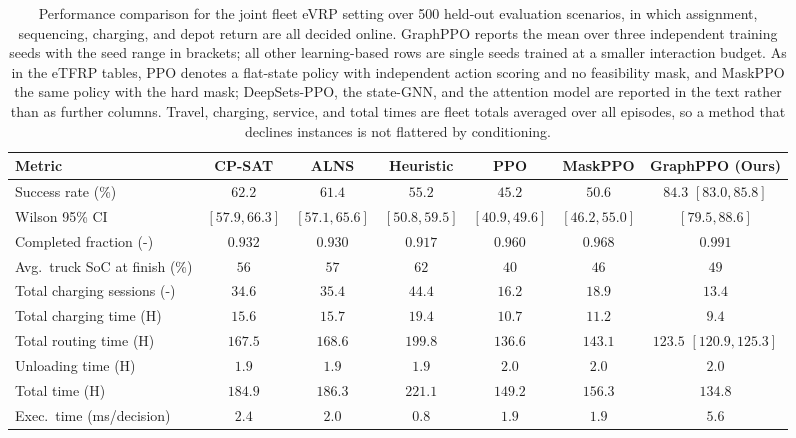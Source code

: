 \documentclass[a4paper,fleqn]{cas-sc}
\begin{document}
\begin{table}
\centering
\small
\caption{Performance comparison for the joint fleet eVRP setting over 500 held-out evaluation scenarios, in which assignment, sequencing, charging, and depot return are all decided online. GraphPPO reports the mean over three independent training seeds with the seed range in brackets; all other learning-based rows are single seeds trained at a smaller interaction budget. As in the eTFRP tables, PPO denotes a flat-state policy with independent action scoring and no feasibility mask, and MaskPPO the same policy with the hard mask; DeepSets-PPO, the state-GNN, and the attention model are reported in the text rather than as further columns. Travel, charging, service, and total times are fleet totals averaged over all episodes, so a method that declines instances is not flattered by conditioning.}
\begin{tabular}{@{}lcccccc@{}}
\toprule
Metric & CP-SAT & ALNS & Heuristic & PPO & MaskPPO & GraphPPO (Ours) \\
\midrule
Success rate (\%) & $62.2$ & $61.4$ & $55.2$ & $45.2$ & $50.6$ & $\mathbf{84.3}$ $[83.0, 85.8]$ \\
Wilson 95\% CI & $[57.9, 66.3]$ & $[57.1, 65.6]$ & $[50.8, 59.5]$ & $[40.9, 49.6]$ & $[46.2, 55.0]$ & $[79.5, 88.6]$ \\
Completed fraction (-) & $0.932$ & $0.930$ & $0.917$ & $0.960$ & $0.968$ & $\mathbf{0.991}$ \\
Avg.\ truck SoC at finish (\%) & $56$ & $57$ & $62$ & $40$ & $46$ & $49$ \\
Total charging sessions (-) & $34.6$ & $35.4$ & $44.4$ & $16.2$ & $18.9$ & $\mathbf{13.4}$ \\
\midrule
Total charging time (H) & $15.6$ & $15.7$ & $19.4$ & $10.7$ & $11.2$ & $\mathbf{9.4}$ \\
Total routing time (H) & $167.5$ & $168.6$ & $199.8$ & $136.6$ & $143.1$ & $\mathbf{123.5}$ $[120.9, 125.3]$ \\
Unloading time (H) & $1.9$ & $1.9$ & $1.9$ & $2.0$ & $2.0$ & $2.0$ \\
Total time (H) & $184.9$ & $186.3$ & $221.1$ & $149.2$ & $156.3$ & $\mathbf{134.8}$ \\
\midrule
Exec.\ time (ms/decision) & $2.4$ & $2.0$ & $\mathbf{0.8}$ & $1.9$ & $1.9$ & $5.6$ \\
\bottomrule
\end{tabular}
\label{tab:joint_evrp_metrics}
\end{table}
\end{document}
